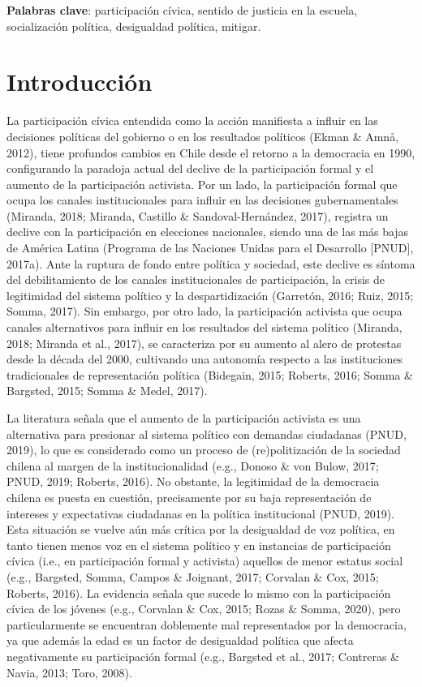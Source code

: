 \documentclass[12pt,twoside]{templates/facsothesis}
\begin{document}
\textbf{Palabras clave}: participación cívica, sentido de justicia en la escuela, socialización política, desigualdad política, mitigar.

\hypertarget{introducciuxf3n}{%
\chapter{Introducción}\label{introducciuxf3n}}

La participación cívica entendida como la acción manifiesta a influir en las decisiones políticas del gobierno o en los resultados políticos (Ekman \& Amnå, 2012), tiene profundos cambios en Chile desde el retorno a la democracia en 1990, configurando la paradoja actual del declive de la participación formal y el aumento de la participación activista. Por un lado, la participación formal que ocupa los canales institucionales para influir en las decisiones gubernamentales (Miranda, 2018; Miranda, Castillo \& Sandoval-Hernández, 2017), registra un declive con la participación en elecciones nacionales, siendo una de las más bajas de América Latina (Programa de las Naciones Unidas para el Desarrollo {[}PNUD{]}, 2017a). Ante la ruptura de fondo entre política y sociedad, este declive es síntoma del debilitamiento de los canales institucionales de participación, la crisis de legitimidad del sistema político y la despartidización (Garretón, 2016; Ruiz, 2015; Somma, 2017). Sin embargo, por otro lado, la participación activista que ocupa canales alternativos para influir en los resultados del sistema político (Miranda, 2018; Miranda et al., 2017), se caracteriza por su aumento al alero de protestas desde la década del 2000, cultivando una autonomía respecto a las instituciones tradicionales de representación política (Bidegain, 2015; Roberts, 2016; Somma \& Bargsted, 2015; Somma \& Medel, 2017).

La literatura señala que el aumento de la participación activista es una alternativa para presionar al sistema político con demandas ciudadanas (PNUD, 2019), lo que es considerado como un proceso de (re)politización de la sociedad chilena al margen de la institucionalidad (e.g., Donoso \& von Bulow, 2017; PNUD, 2019; Roberts, 2016). No obstante, la legitimidad de la democracia chilena es puesta en cuestión, precisamente por su baja representación de intereses y expectativas ciudadanas en la política institucional (PNUD, 2019). Esta situación se vuelve aún más crítica por la desigualdad de voz política, en tanto tienen menos voz en el sistema político y en instancias de participación cívica (i.e., en participación formal y activista) aquellos de menor estatus social (e.g., Bargsted, Somma, Campos \& Joignant, 2017; Corvalan \& Cox, 2015; Roberts, 2016). La evidencia señala que sucede lo mismo con la participación cívica de los jóvenes (e.g., Corvalan \& Cox, 2015; Rozas \& Somma, 2020), pero particularmente se encuentran doblemente mal representados por la democracia, ya que además la edad es un factor de desigualdad política que afecta negativamente su participación formal (e.g., Bargsted et al., 2017; Contreras \& Navia, 2013; Toro, 2008).
\end{document}
